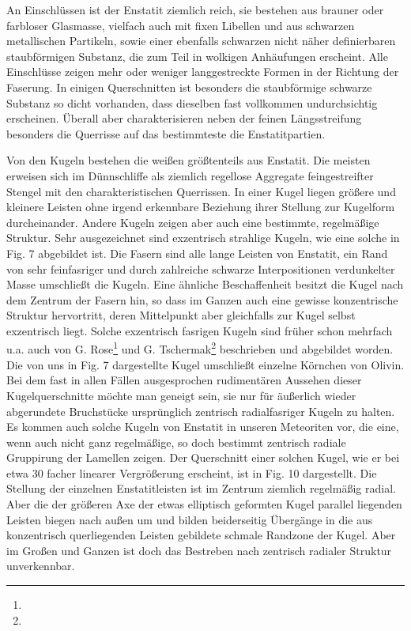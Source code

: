 \documentclass[a4paper, 11pt, oneside]{article}
\begin{document}
An Einschlüssen ist der Enstatit ziemlich reich, sie bestehen aus brauner oder farbloser Glasmasse, vielfach auch mit fixen Libellen und aus schwarzen metallischen Partikeln, sowie einer ebenfalls schwarzen nicht näher definierbaren staubförmigen Substanz, die zum Teil in wolkigen Anhäufungen erscheint. Alle Einschlüsse zeigen mehr oder weniger langgestreckte Formen in der Richtung der Faserung. In einigen Querschnitten ist besonders die staubförmige schwarze Substanz so dicht vorhanden, dass dieselben fast vollkommen undurchsichtig erscheinen. Überall aber charakterisieren neben der feinen Längsstreifung besonders die Querrisse auf das bestimmteste die Enstatitpartien.

Von den Kugeln bestehen die weißen größtenteils aus Enstatit. Die meisten erweisen sich im Dünnschliffe als ziemlich regellose Aggregate feingestreifter Stengel mit den charakteristischen Querrissen. In einer Kugel liegen größere und kleinere Leisten ohne irgend erkennbare Beziehung ihrer Stellung zur Kugelform durcheinander. Andere Kugeln zeigen aber auch eine bestimmte, regelmäßige Struktur. Sehr ausgezeichnet sind exzentrisch strahlige Kugeln, wie eine solche in Fig. 7 abgebildet ist. Die Fasern sind alle lange Leisten von Enstatit, ein Rand von sehr feinfasriger und durch zahlreiche schwarze Interpositionen verdunkelter Masse umschließt die Kugeln. Eine ähnliche Beschaffenheit besitzt die Kugel nach dem Zentrum der Fasern hin, so dass im Ganzen auch eine gewisse konzentrische Struktur hervortritt, deren Mittelpunkt aber gleichfalls zur Kugel selbst exzentrisch liegt. Solche exzentrisch fasrigen Kugeln sind früher schon mehrfach u.a. auch von G. Rose\footnote{} und G. Tschermak\footnote{} beschrieben und abgebildet worden. Die von uns in Fig. 7 dargestellte Kugel umschließt einzelne Körnchen von Olivin. Bei dem fast in allen Fällen ausgesprochen rudimentären Aussehen dieser Kugelquerschnitte möchte man geneigt sein, sie nur für äußerlich wieder abgerundete Bruchstücke ursprünglich zentrisch radialfasriger Kugeln zu halten. Es kommen auch solche Kugeln von Enstatit in unseren Meteoriten vor, die eine, wenn auch nicht ganz regelmäßige, so doch bestimmt zentrisch radiale Gruppirung der Lamellen zeigen. Der Querschnitt einer solchen Kugel, wie er bei etwa 30 facher linearer Vergrößerung erscheint, ist in Fig. 10 dargestellt. Die Stellung der einzelnen Enstatitleisten ist im Zentrum ziemlich regelmäßig radial. Aber die der größeren Axe der etwas elliptisch geformten Kugel parallel liegenden Leisten biegen nach außen um und bilden beiderseitig Übergänge in die aus konzentrisch querliegenden Leisten gebildete schmale Randzone der Kugel. Aber im Großen und Ganzen ist doch das Bestreben nach zentrisch radialer Struktur unverkennbar.
\end{document}
